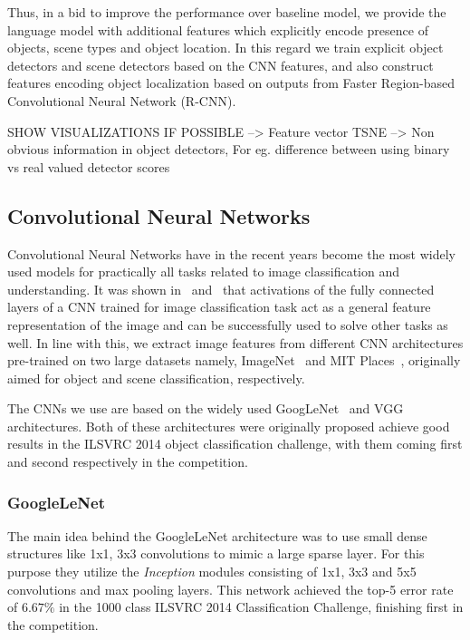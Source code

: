 Thus, in a bid to improve the performance over baseline model, we provide the
language model with additional features which explicitly encode presence of
objects, scene types and object location.
In this regard we train explicit object detectors and scene detectors based on
the CNN features, and also construct features encoding object localization based
on outputs from Faster Region-based Convolutional Neural Network (R-CNN).

SHOW VISUALIZATIONS IF POSSIBLE
    --> Feature vector TSNE
    --> Non obvious information in object detectors, For eg. difference between
    using binary vs real valued detector scores
\subsection{Convolutional Neural Networks}
Convolutional Neural Networks have in the recent years become the most
widely used models for practically all tasks related to image
classification and understanding.
It was shown in~\cite{Donahue2014} and~\cite{Razavian2014CVPR} that
activations of the fully connected layers of a CNN trained for image
classification task act as a general feature representation of the
image and can be successfully used to solve other tasks as well.
In line with this, we extract image features from different CNN architectures
pre-trained on two large datasets namely, ImageNet~\cite{ImagenetOrig} and MIT
Places~\cite{Zhou2014NIPS}, originally aimed for object and scene
classification, respectively.

The CNNs we use are based on the widely used
GoogLeNet~\cite{DBLP:journals/corr/SzegedyLJSRAEVR14} and VGG~\cite{Simonyan14c}
architectures. 
Both of these architectures were originally proposed achieve good results in the
ILSVRC 2014 object classification challenge, with them coming first and second
respectively in the competition.

\subsubsection{GoogleLeNet} 
The main idea behind the GoogleLeNet architecture was to use small dense
structures like 1x1, 3x3 convolutions to mimic a large sparse layer.
For this purpose they utilize the \emph{Inception} modules consisting of 1x1,
3x3 and 5x5 convolutions and max pooling layers.
This network achieved the top-5 error rate of $6.67\%$ in the 1000 class ILSVRC 2014
Classification Challenge, finishing first in the competition.

